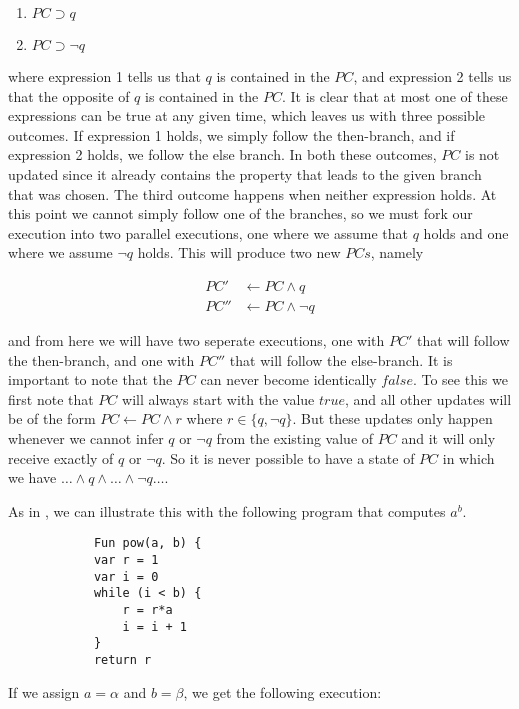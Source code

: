 		\begin{enumerate}
			\item $ PC \supset q$
			\item $ PC \supset \neg q$
		\end{enumerate}
		
		where expression 1 tells us that $q$ is contained in the $PC$, and expression 2 tells us that the opposite of $q$ is contained in the $PC$. It is clear that at most one of these expressions can be true at any given time, which leaves us with three possible outcomes. If expression 1 holds, we simply follow the then-branch, and if expression 2 holds, we follow the else branch. In both these outcomes, $PC$ is not updated since it already contains the property that leads to the given branch that was chosen. The third outcome happens when neither expression holds. At this point we cannot simply follow one of the branches, so we must fork our execution into two parallel executions, one where we assume that $q$ holds and one where we assume $\neg q$ holds. This will produce two new $PCs$, namely 
		
		\begin{align*}
			PC' & \gets PC \land q \\
			PC''  & \gets PC \land \neg q
		\end{align*}
		
		and from here we will have two seperate executions, one with $PC'$ that will follow the then-branch, and one with $PC''$ that will follow the else-branch. 
		It is important to note that the $PC$ can never become identically $false$. To see this we first note that $PC$ will always start with the value $true$, and all other updates will be of the form $PC \gets PC \land r$ where 
		$r \in \{q, \neg q\}$. But these updates only happen whenever we cannot infer $q$ or $\neg q$ from the existing value of $PC$ and it will only receive exactly of $q$ or $\neg q$. So it is never possible to have a state of $PC$ in which we have $ \ldots \land q \land \ldots \land \neg q \ldots$. 
		
		As in \cite{king76}, we can illustrate this with the following program that computes $a^b$.
		
		\begin{verbatim}
			Fun pow(a, b) {
			var r = 1
			var i = 0
			while (i < b) {
				r = r*a
				i = i + 1 
			}
			return r
		\end{verbatim}
		
		If we assign $a = \alpha$ and $b = \beta$, we get the following execution:
		

